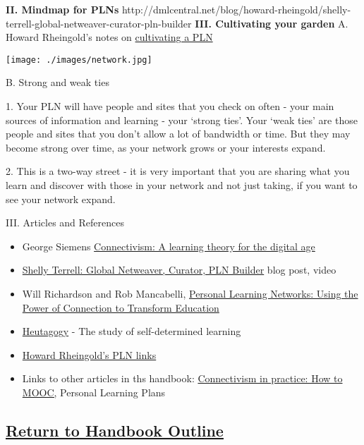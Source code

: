 \textbf{II. Mindmap for PLNs}
http://dmlcentral.net/blog/howard-rheingold/shelly-terrell-global-netweaver-curator-pln-builder
\textbf{III. Cultivating your garden} A. Howard Rheingold's notes on
\href{http://howardrheingoldsteachingnotes.posterous.com/notes-on-growing-a-personal-learning-network}{cultivating
a PLN}

\begin{center}
\texttt{[image: ./images/network.jpg]}
\end{center}

B. Strong and weak ties

1. Your PLN will have people and sites that you check on often - your
main sources of information and learning - your `strong ties'. Your
`weak ties' are those people and sites that you don't allow a lot of
bandwidth or time. But they may become strong over time, as your network
grows or your interests expand.

2. This is a two-way street - it is very important that you are sharing
what you learn and discover with those in your network and not just
taking, if you want to see your network expand.

III. Articles and References

\begin{itemize}
\item
  George Siemens
  \href{http://www.itdl.org/journal/jan\_05/article01.htm}{Connectivism:
  A learning theory for the digital age}
\item
  \href{http://dmlcentral.net/blog/howard-rheingold/shelly-terrell-global-netweaver-curator-pln-builder}{Shelly
  Terrell: Global Netweaver, Curator, PLN Builder} blog post, video
\item
  Will Richardson and Rob Mancabelli,
  \href{http://weblogg-ed.com/2011/personal-learning-networks-an-excerpt/}{Personal
  Learning Networks: Using the Power of Connection to Transform
  Education}
\item
  \href{http://en.wikipedia.org/wiki/Heutagogy}{Heutagogy} - The study
  of self-determined learning
\item
  \href{http://delicious.com/hrheingold/pln}{Howard Rheingold's PLN
  links}
\item
  Links to other articles in ths handbook:
  \href{http://peeragogy.org/connectivism-in-practice-how-to-organize-a-mooc/}{Connectivism
  in practice: How to MOOC,} Personal Learning Plans
\end{itemize}
\subsection{\href{http://socialmediaclassroom.com/host/peeragogy/wiki/initial-outline-source-book}{Return
to Handbook Outline}}

